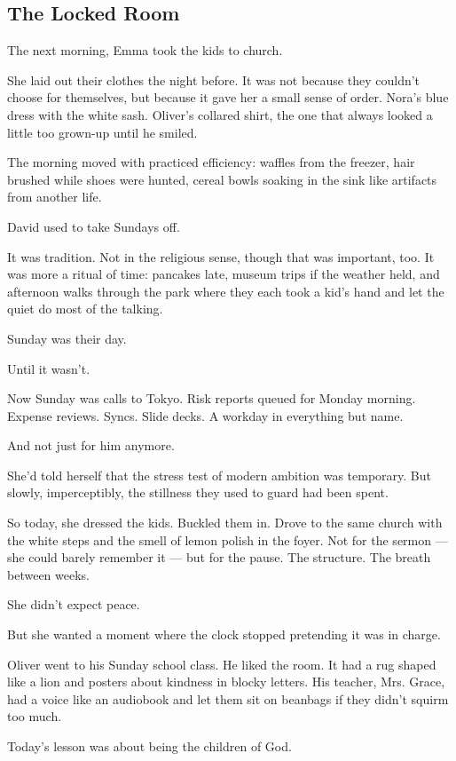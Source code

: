
\subsection{The Locked Room}

The next morning, Emma took the kids to church.

She laid out their clothes the night before. It was not because they couldn’t choose for themselves, but 
because it gave her a small sense of order. Nora’s blue dress with the white sash. Oliver’s collared shirt, 
the one that always looked a little too grown-up until he smiled.

The morning moved with practiced efficiency: waffles from the freezer, hair brushed while shoes were 
hunted, cereal bowls soaking in the sink like artifacts from another life. 

David used to take Sundays off.

It was tradition. Not in the religious sense, though that was important, too. It was more a ritual of 
time: pancakes late, museum trips if the weather held, and afternoon walks through the park where they 
each took a kid’s hand and let the quiet do most of the talking.

Sunday was their day.

Until it wasn’t.

Now Sunday was calls to Tokyo. Risk reports queued for Monday morning. Expense reviews. Syncs. Slide decks. 
A workday in everything but name.

And not just for him anymore.

She’d told herself that the stress test of modern ambition was temporary. But slowly, imperceptibly, the 
stillness they used to guard had been spent.

So today, she dressed the kids. Buckled them in. Drove to the same church with the white steps and the 
smell of lemon polish in the foyer. Not for the sermon --- she could barely remember it --- but for the 
pause. The structure. The breath between weeks.

She didn’t expect peace.

But she wanted a moment where the clock stopped pretending it was in charge.

Oliver went to his Sunday school class. He liked the room. It had a rug shaped like a lion and posters 
about kindness in blocky letters. His teacher, Mrs. Grace, had a voice like an audiobook and let them 
sit on beanbags if they didn’t squirm too much.

Today’s lesson was about being the children of God.

